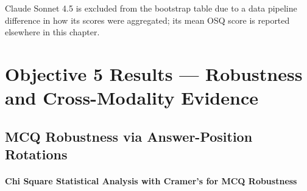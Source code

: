 Claude Sonnet 4.5 is excluded from the bootstrap table due to a data pipeline difference in how its scores were aggregated; its mean OSQ score is reported elsewhere in this chapter.


\clearpage
\section{Objective 5 Results --- Robustness and Cross-Modality Evidence}\label{sec:obj5_results_mirror}

\subsection{MCQ Robustness via Answer-Position Rotations}\label{subsec:obj5_mcq_robustness_mirror}

\paragraph{Chi Square Statistical Analysis with Cramer's for MCQ Robustness}


